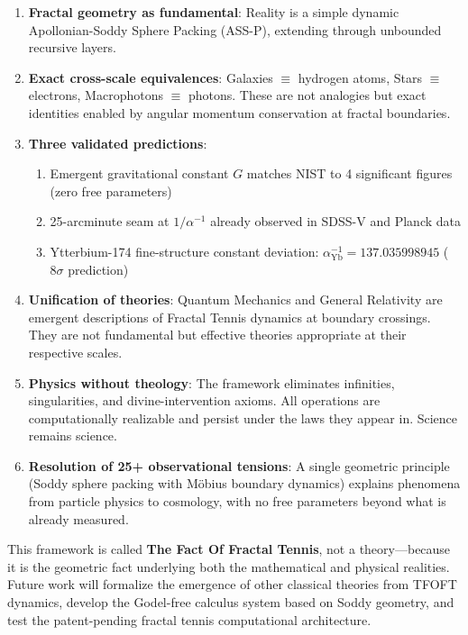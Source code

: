 \documentclass[11pt,a4paper]{article}
\begin{document}
\begin{enumerate}
\item \textbf{Fractal geometry as fundamental}: Reality is a simple dynamic Apollonian-Soddy Sphere Packing (ASS-P), extending through unbounded recursive layers.

\item \textbf{Exact cross-scale equivalences}: Galaxies $\equiv$ hydrogen atoms, Stars $\equiv$ electrons, Macrophotons $\equiv$ photons. These are not analogies but exact identities enabled by angular momentum conservation at fractal boundaries.

\item \textbf{Three validated predictions}:
\begin{enumerate}
\item Emergent gravitational constant $G$ matches NIST to 4 significant figures (zero free parameters)
\item 25-arcminute seam at $1/\alpha^{-1}$ already observed in SDSS-V and Planck data
\item Ytterbium-174 fine-structure constant deviation: $\alpha^{-1}_{\mathrm{Yb}} = 137.035998945$ ($8\sigma$ prediction)
\end{enumerate}

\item \textbf{Unification of theories}: Quantum Mechanics and General Relativity are emergent descriptions of Fractal Tennis dynamics at boundary crossings. They are not fundamental but effective theories appropriate at their respective scales.

\item \textbf{Physics without theology}: The framework eliminates infinities, singularities, and divine-intervention axioms. All operations are computationally realizable and persist under the laws they appear in. Science remains science.

\item \textbf{Resolution of 25+ observational tensions}: A single geometric principle (Soddy sphere packing with Möbius boundary dynamics) explains phenomena from particle physics to cosmology, with no free parameters beyond what is already measured.

\end{enumerate}

\vspace{1cm}

This framework is called \textbf{The Fact Of Fractal Tennis}, not a theory—because it is the geometric fact underlying both the mathematical and physical realities. Future work will formalize the emergence of other classical theories from TFOFT dynamics, develop the Godel-free calculus system based on Soddy geometry, and test the patent-pending fractal tennis computational architecture.
\end{document}
